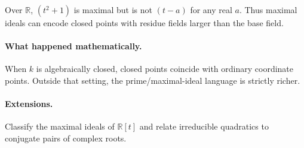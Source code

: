 Over \(\mathbb R\), \((t^2+1)\) is maximal but is not \((t-a)\) for any real \(a\).  Thus
maximal ideals can encode closed points with residue fields larger than the base field.

\paragraph{What happened mathematically.}
When $k$ is algebraically closed, closed points coincide with ordinary coordinate points.
Outside that setting, the prime/maximal-ideal language is strictly richer.

\paragraph{Extensions.}
Classify the maximal ideals of \(\mathbb R[t]\) and relate irreducible quadratics to
conjugate pairs of complex roots.
\fi
